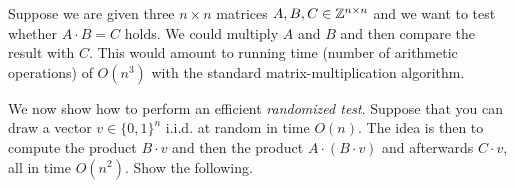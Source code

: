 \documentclass[11pt]{article}
\begin{document}
%
%  
%

%

\problem Suppose we are given three $n \times n$ matrices $A,B,C \in \mathbb{Z}^{n \times n}$ and we want to test whether $A \cdot B = C$ holds. We could multiply $A$ and $B$ and then compare the result with $C$. This would amount to running time (number of arithmetic operations) of $O(n^3)$ with the standard matrix-multiplication algorithm. 

We now show how to perform an efficient \emph{randomized test}. Suppose that you can draw a vector $v \in \{0,1\}^n$  i.i.d. at random in time $O(n)$. The idea is then to compute the product $B \cdot v$ and then the product $A \cdot (B \cdot v)$ and afterwards $C \cdot v$, all in time $O(n^2)$. Show the following. 
\end{document}
